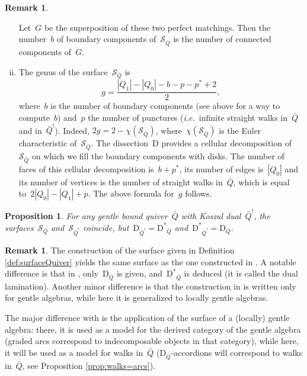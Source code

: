 \documentclass{amsart}
\newtheorem{proposition}[theorem]{Proposition}
\theoremstyle{definition}
\newtheorem{remark}[theorem]{Remark}
\newcommand{\ie}{\textit{i.e.}~} %
\newcommand{\surface}{\mathcal{S}} %
\newcommand{\dual}{^*} %
\newcommand{\dissection}{\mathrm{D}} %
\newcommand{\koszul}{^!} %
\begin{document}
\begin{remark}
\begin{enumerate}[(i)]
      Let~$G$ be the superposition of these two perfect matchings.
      Then the number~$b$ of boundary components of~$\surface_{\bar Q}$ is the number of connected components of~$G$.
\item The genus of the surface~$\surface_{\bar Q}$ is
      \[
       g = \frac{|Q_1| - |Q_0| - b - p - p\dual + 2}{2},
      \]
      where~$b$ is the number of boundary components (see above for a way to compute~$b$) and~$p$ the number of punctures (\ie infinite straight walks in~$\bar Q$ and in~$\bar Q\koszul$).
      Indeed, ${2g = 2-\chi(\surface_{\bar Q})}$, where~$\chi(\surface_{\bar Q})$ is the Euler characteristic of~$\surface_{\bar Q}$.
      The dissection~$\dissection$ provides a cellular decomposition of~$\surface_{\bar Q}$ on which we fill the boundary components with disks.  
      The number of faces of this cellular decomposition is~$b + p\dual$, its number of edges is~$|Q_0|$ and its number of vertices is the number of straight walks in~$\bar Q$, which is equal to~$2|Q_0| - |Q_1| + p$.
      The above formula for~$g$ follows.
\end{enumerate}
\end{remark}

\begin{proposition}
\label{prop:dualityKoszul2}
For any gentle bound quiver~$\bar Q$ with Koszul dual~$\bar Q\koszul$, the surfaces~$\surface_{\bar Q}$ and~$\surface_{\bar Q\koszul}$ coincide, but~$\dissection_{\bar Q\koszul} = {\dissection\dual\!\!_{\bar Q}}$ and~${\dissection\dual\!\!_{\bar Q\koszul}} = \dissection_{\bar Q}$.
\end{proposition}

\begin{remark}
\label{rem:comparisonWithOPS}
The construction of the surface given in Definition \ref{def:surfaceQuiver} yields the same surface as the one constructed in \cite{OpperPlamondonSchroll}.
A notable difference is that in \cite{OpperPlamondonSchroll}, only~$\dissection_{\bar Q}$ is given, and~$\dissection\dual\!\!_{\bar Q}$ is deduced (it is called the dual lamination).
Another minor difference is that the construction in \cite{OpperPlamondonSchroll} is written only for gentle algebras, while here it is generalized to locally gentle algebras.

The major difference with \cite{OpperPlamondonSchroll} is the application of the surface of a (locally) gentle algebra: there, it is used as a model for the derived category of the gentle algebra (graded arcs correspond to indecomposable objects in that category), while here, it will be used as a model for walks in~$\bar Q$ ($\dissection_{\bar Q}$-accordions will correspond to walks in~$\bar{Q}$, see Proposition \ref{prop:walks=arcs}).
\end{remark}
\end{document}
